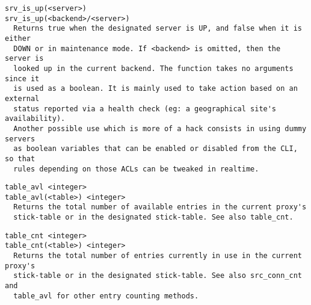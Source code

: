 \begin{verbatim}
srv_is_up(<server>)
srv_is_up(<backend>/<server>)
  Returns true when the designated server is UP, and false when it is either
  DOWN or in maintenance mode. If <backend> is omitted, then the server is
  looked up in the current backend. The function takes no arguments since it
  is used as a boolean. It is mainly used to take action based on an external
  status reported via a health check (eg: a geographical site's availability).
  Another possible use which is more of a hack consists in using dummy servers
  as boolean variables that can be enabled or disabled from the CLI, so that
  rules depending on those ACLs can be tweaked in realtime.
\end{verbatim}

\begin{verbatim}
table_avl <integer>
table_avl(<table>) <integer>
  Returns the total number of available entries in the current proxy's
  stick-table or in the designated stick-table. See also table_cnt.
\end{verbatim}

\begin{verbatim}
table_cnt <integer>
table_cnt(<table>) <integer>
  Returns the total number of entries currently in use in the current proxy's
  stick-table or in the designated stick-table. See also src_conn_cnt and
  table_avl for other entry counting methods.
\end{verbatim}

